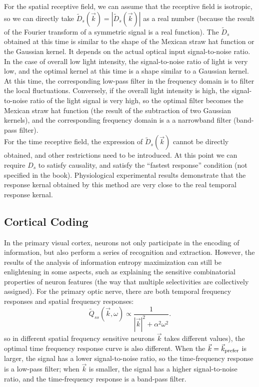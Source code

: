 For the spatial receptive field, we can assume that the receptive
field is isotropic, so we can directly take
$\tilde{D}_{s}(\vec{k})=|\tilde{D}_{s}(\vec{k})|$ as a real number (because the
result of the Fourier transform of a symmetric signal is a real
function). The $\tilde{D}_{s}$ obtained at this time is similar to the
shape of the Mexican straw hat function or the Gaussian kernel. It
depends on the actual optical input signal-to-noise ratio. In the case
of overall low light intensity, the signal-to-noise ratio of light is
very low, and the optimal kernel at this time is a shape similar to a
Gaussian kernel. At this time, the corresponding low-pass filter in
the frequency domain is to filter the local fluctuations. Conversely,
if the overall light intensity is high, the signal-to-noise ratio of
the light signal is very high, so the optimal filter becomes the
Mexican straw hat function (the result of the subtraction of two
Gaussian kernels), and the corresponding frequency domain is a a
narrowband filter (band-pass filter).\\

For the time receptive field, the expression of $\tilde{D}_{s}(\vec{k})$ cannot be directly obtained, and other restrictions need to be introduced. At this point we can require $D_{s}$ to satisfy causality, and satisfy the ``fastest response'' condition (not specified in the book). Physiological experimental results demonstrate that the response kernal obtained by this method are very close to the real temporal response kernal.

\subsection{Cortical Coding}

In the primary visual cortex, neurons not only participate in the
encoding of information, but also perform a series of recognition and
extraction. However, the results of the analysis of information
entropy maximization can still be enlightening in some aspects, such
as explaining the sensitive combinatorial properties of neuron
features (the way that multiple selectivities are collectively
assigned). For the primary optic nerve, there are both temporal
frequency responses and spatial frequency responses:
\begin{equation}
  \tilde{Q}_{ss}\left(\vec{k},\omega\right)\propto \frac{1}{| \vec{k}|^2 +\alpha^2\omega^2}.
\end{equation}
 so in
different spatial frequency sensitive neurons $\vec{k}$ takes
different values), the optimal time frequency response curve is also
different. When the $\vec{k}=\vec{k}_{\rm{prefer}}$ is larger, the signal has
a lower signal-to-noise ratio, so the time-frequency response is a
low-pass filter; when $\vec{k}$ is smaller, the signal has a
higher signal-to-noise ratio, and the time-frequency response is a
band-pass filter.
